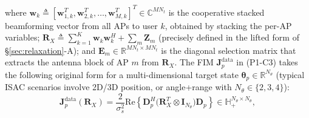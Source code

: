 \documentclass[12pt,a4paper]{article}
\newcommand{\vect}[1]{\mathbf{#1}}
\newcommand{\mat}[1]{\mathbf{#1}}
\newcommand{\Real}{\text{Re}}
\begin{document}
where $\vect{w}_k \triangleq [\vect{w}_{1,k}^T, \vect{w}_{2,k}^T, \ldots, \vect{w}_{M,k}^T]^T \in \mathbb{C}^{MN_t}$ is the cooperative stacked beamforming vector from all APs to user $k$, obtained by stacking the per-AP variables; $\mat{R}_X \triangleq \sum_{k=1}^{K} \vect{w}_k \vect{w}_k^H + \sum_m \mat{Z}_m$ (precisely defined in the lifted form of \S\ref{sec:relaxation}-A); and $\mat{E}_m \in \mathbb{R}^{MN_t \times MN_t}$ is the diagonal selection matrix that extracts the antenna block of AP $m$ from $\mat{R}_X$. The FIM $\mat{J}_p^{\text{data}}$ in (P1-C3) takes the following original form for a multi-dimensional target state $\boldsymbol{\theta}_p \in \mathbb{R}^{N_\theta}$ (typical ISAC scenarios involve 2D/3D position, or angle+range with $N_\theta \in \{2, 3, 4\}$):
\begin{equation}\label{eq:fim-original}
\mat{J}_p^{\text{data}}(\mat{R}_X) = \frac{2}{\sigma_s^2} \Real\!\left\{ \mat{D}_p^H \big( \mat{R}_X^T \otimes \mat{I}_{N_\theta} \big) \mat{D}_p \right\} \in \mathbb{H}_+^{N_\theta \times N_\theta},
\end{equation}
\end{document}
